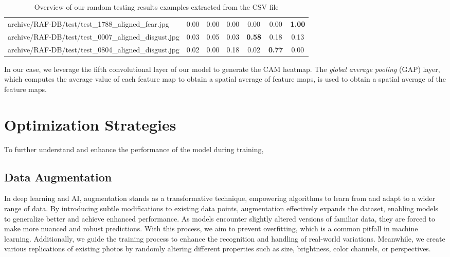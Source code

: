 \begin{table}[ht]
\begin{tabular}{@{}lcccccc@{}}
  archive/RAF-DB/test/test\_1788\_aligned\_fear.jpg & 0.00 & 0.00 & 0.00 & 0.00 & 0.00 & \textbf{1.00} \\
  archive/RAF-DB/test/test\_0007\_aligned\_disgust.jpg & 0.03 & 0.05 & 0.03 & \textbf{0.58} & 0.18 & 0.13 \\
  archive/RAF-DB/test/test\_0804\_aligned\_disgust.jpg & 0.02 & 0.00 & 0.18 & 0.02 & \textbf{0.77} & 0.00 \\
  \bottomrule
  \end{tabular}
  \caption{Overview of our random testing results examples extracted from the CSV file}
  \label{tab:testcsv}
\end{table}  

In our case, we leverage the fifth convolutional layer of our model to generate the CAM heatmap.
The \textit{global average pooling} (GAP) layer, 
which computes the average value of each feature map to obtain a spatial average of feature maps, 
is used to obtain a spatial average of the feature maps. 

\section{Optimization Strategies}
\label{sec:optim}

To further understand and enhance the performance of the model during training, 

\subsection{Data Augmentation}
\label{sec:optim:aug}

In deep learning and AI, 
augmentation stands as a transformative technique, 
empowering algorithms to learn from and adapt to a wider range of data. 
By introducing subtle modifications to existing data points, 
augmentation effectively expands the dataset, 
enabling models to generalize better and achieve enhanced performance. 
As models encounter slightly altered versions of familiar data, 
they are forced to make more nuanced and robust predictions. 
With this process, we aim to prevent overfitting, which is a common pitfall in machine learning. 
Additionally, we guide the training process to enhance the recognition and handling of real-world variations.
Meanwhile, we create various replications of existing photos by randomly altering different properties such as size, brightness, color channels, or perspectives.

